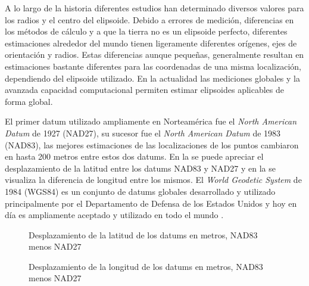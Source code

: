 A lo largo de la historia diferentes estudios han determinado diversos valores para los radios y el centro del elipsoide. Debido a errores de medición, diferencias en los métodos de cálculo y a que la tierra no es un elipsoide perfecto, diferentes estimaciones alrededor del mundo tienen ligeramente diferentes orígenes, ejes de orientación y radios. Estas diferencias aunque pequeñas, generalmente resultan en estimaciones bastante diferentes para las coordenadas de una misma localización, dependiendo del elipsoide utilizado. En la actualidad las mediciones globales y la avanzada capacidad computacional permiten estimar elipsoides aplicables de forma global.

El primer datum utilizado ampliamente en Norteamérica fue el \emph{North American Datum} de 1927 (NAD27), su sucesor fue el \emph{North American Datum} de 1983 (NAD83), las mejores estimaciones de las localizaciones de los puntos cambiaron en hasta 200 metros entre estos dos datums. En la  se puede apreciar el desplazamiento de la latitud entre los datums NAD83 y NAD27 y en la  se visualiza la diferencia de longitud entre los mismos. El \emph{World Geodetic System} de 1984 (WGS84) es un conjunto de datums globales desarrollado y utilizado principalmente por el Departamento de Defensa de los Estados Unidos y hoy en día es ampliamente aceptado y utilizado en todo el mundo \citep{longley2005geographic}.

\begin{figure}[h]
	\centering
	
	\caption[Desplazamiento de la latitud entre NAD83 y NAD27]{Desplazamiento de la latitud de los datums en metros, NAD83 menos NAD27}
	\label{fig:datum-latitud} 
\end{figure}

\begin{figure}[h]
	\centering
	
	\caption[Desplazamiento de la longitud entre NAD83 y NAD27]{Desplazamiento de la longitud de los datums en metros, NAD83 menos NAD27}
	\label{fig:datum-longitud} 
\end{figure}



